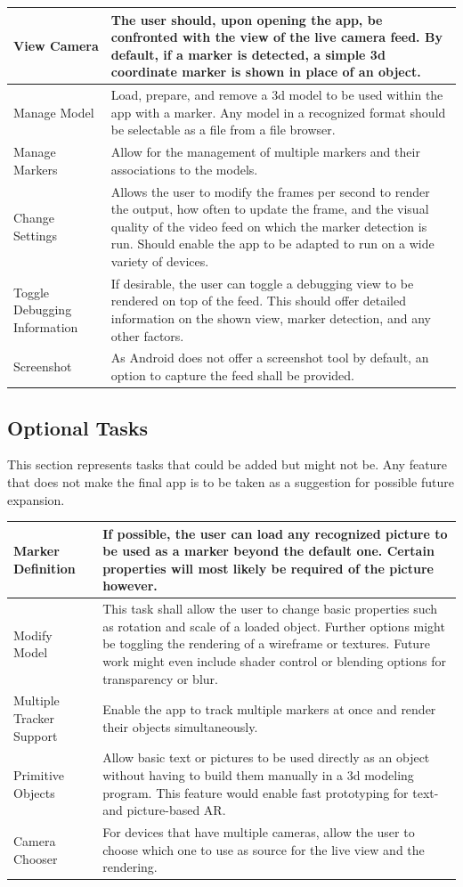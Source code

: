 \begin{tabulary}{\textwidth}{L || L}
View Camera & The user should, upon opening the app, be confronted with the view of the live camera feed. By default, if a marker is detected, a simple 3d coordinate marker is shown in place of an object. \\
\hline
Manage Model & Load, prepare, and remove a 3d model to be used within the app with a marker. Any model in a recognized format should be selectable as a file from a file browser. \\
\hline
Manage Markers & Allow for the management of multiple markers and their associations to the models. \\
\hline
Change Settings & Allows the user to modify the frames per second to render the output, how often to update the frame, and the visual quality of the video feed on which the marker detection is run. Should enable the app to be adapted to run on a wide variety of devices.\\
\hline
Toggle Debugging Information & If desirable, the user can toggle a debugging view to be rendered on top of the feed. This should offer detailed information on the shown view, marker detection, and any other factors. \\
\hline
Screenshot & As Android does not offer a screenshot tool by default, an option to capture the feed shall be provided. \\
\end{tabulary}

\subsection{Optional Tasks}

This section represents tasks that could be added but might not be.
Any feature that does not make the final app is to be taken as a suggestion for possible future expansion.

\begin{tabulary}{\textwidth}{L || L}
Marker Definition & If possible, the user can load any recognized picture to be used as a marker beyond the default one. Certain properties will most likely be required of the picture however. \\
\hline
Modify Model & This task shall allow the user to change basic properties such as rotation and scale of a loaded object. Further options might be toggling the rendering of a wireframe or textures. Future work might even include shader control or blending options for transparency or blur.\\
\hline
Multiple Tracker Support & Enable the app to track multiple markers at once and render their objects simultaneously.\\
\hline
Primitive Objects & Allow basic text or pictures to be used directly as an object without having to build them manually in a 3d modeling program. This feature would enable fast prototyping for text- and picture-based AR.\\
\hline
Camera Chooser & For devices that have multiple cameras, allow the user to choose which one to use as source for the live view and the rendering.\\
\end{tabulary}

